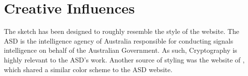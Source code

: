 \documentclass[12pt,a4paper]{article}
\begin{document}
		\begin{center}
			\par
		\end{center}
	
	\newpage

	\section{Creative Influences}
		The sketch has been designed to roughly resemble the style of the 
		\textcite{ASD2023} website. The ASD is the intelligence agency of Australia responsible 
		for conducting signals intelligence on behalf of the Australian Government. As such, 
		Cryptography is highly relevant to the ASD's work. Another source of styling was 
		the website of \textcite{QUT2023}, which shared a similar color scheme to the ASD website.\\
		
\end{document}
